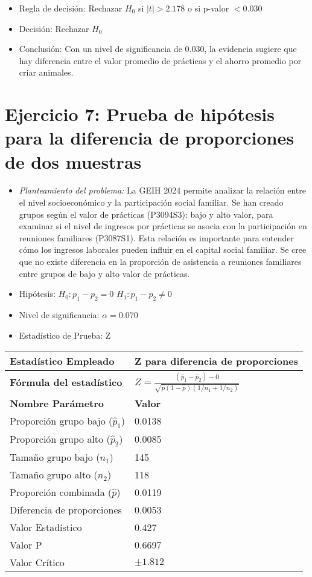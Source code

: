 \documentclass[12pt,a4paper]{article}
\begin{document}
\begin{itemize}
    \item Regla de decisión: Rechazar $H_0$ si $|t| > 2.178$ o si p-valor $< 0.030$
    \item Decisión: Rechazar $H_0$
    \item Conclusión: Con un nivel de significancia de 0.030, la evidencia sugiere que hay diferencia entre el valor promedio de prácticas y el ahorro promedio por criar animales.
\end{itemize}

\section*{Ejercicio 7: Prueba de hipótesis para la diferencia de proporciones de dos muestras}
\begin{itemize}
    \item \textit{Planteamiento del problema:} La GEIH 2024 permite analizar la relación entre el nivel socioeconómico y la participación social familiar. Se han creado grupos según el valor de prácticas (P3094S3): bajo y alto valor, para examinar si el nivel de ingresos por prácticas se asocia con la participación en reuniones familiares (P3087S1). Esta relación es importante para entender cómo los ingresos laborales pueden influir en el capital social familiar. Se cree que no existe diferencia en la proporción de asistencia a reuniones familiares entre grupos de bajo y alto valor de prácticas.
    \item Hipótesis: \quad $H_{0}: p_1 - p_2 = 0$ \hspace{2cm} $H_{1}: p_1 - p_2 \neq 0$
    \item Nivel de significancia: $\alpha = 0.070$
    \item Estadístico de Prueba: Z
\end{itemize}

\begin{tabular}{|m{7cm}|m{7cm}|}
\hline
\textbf{Estadístico Empleado} & Z para diferencia de proporciones \\ \hline
\textbf{Fórmula del estadístico} & $Z = \frac{(\hat{p}_1 - \hat{p}_2) - 0}{\sqrt{\hat{p}(1-\hat{p})(1/n_1 + 1/n_2)}}$ \\ \hline
\textbf{Nombre Parámetro} & \textbf{Valor} \\ \hline
Proporción grupo bajo ($\hat{p}_1$) & 0.0138 \\ \hline
Proporción grupo alto ($\hat{p}_2$) & 0.0085 \\ \hline
Tamaño grupo bajo ($n_1$) & 145 \\ \hline
Tamaño grupo alto ($n_2$) & 118 \\ \hline
Proporción combinada ($\hat{p}$) & 0.0119 \\ \hline
Diferencia de proporciones & 0.0053 \\ \hline
Valor Estadístico & 0.427 \\ \hline
Valor P & 0.6697 \\ \hline
Valor Crítico & $\pm 1.812$ \\ \hline
\end{tabular}
\end{document}
